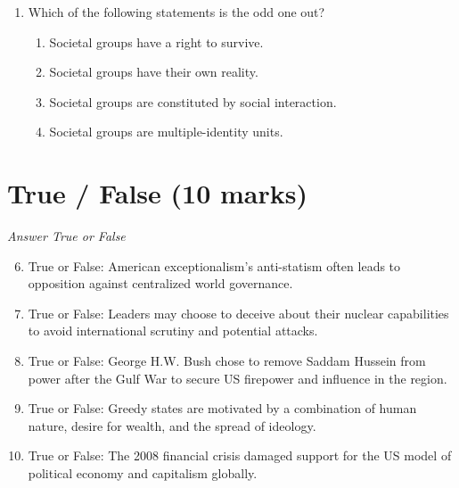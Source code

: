 \documentclass[12pt]{article}
\begin{document}
\begin{enumerate}[label=\arabic*.]
\begin{enumerate}[label=(\alph*)]
    \item The right to privacy is explicitly granted in the Preamble to the Constitution.
    \item The Supreme Court has ruled that the right to privacy is implied by the Bill of Rights.
    \item Common law requires the government to respect citizens' right to privacy.
\end{enumerate}
\item Which of the following statements is the odd one out?
\begin{enumerate}[label=(\alph*)]
    \item Societal groups have a right to survive.
    \item Societal groups have their own reality.
    \item Societal groups are constituted by social interaction.
    \item Societal groups are multiple-identity units.
\end{enumerate}
\end{enumerate}

\section*{True / False (10 marks)}
\textit{Answer True or False}
\begin{enumerate}[label=\arabic*.]
\setcounter{enumi}{5}
\item True or False: American exceptionalism's anti-statism often leads to opposition against centralized world governance.
\item True or False: Leaders may choose to deceive about their nuclear capabilities to avoid international scrutiny and potential attacks.
\item True or False: George H.W. Bush chose to remove Saddam Hussein from power after the Gulf War to secure US firepower and influence in the region.
\item True or False: Greedy states are motivated by a combination of human nature, desire for wealth, and the spread of ideology.
\item True or False: The 2008 financial crisis damaged support for the US model of political economy and capitalism globally.
\end{enumerate}
\end{document}
